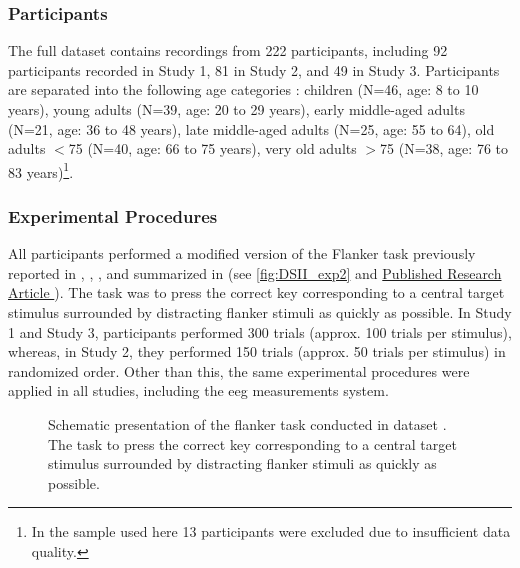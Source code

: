 \subsubsection{Participants}
\label{methods:datasets:II:participants}
The full dataset contains recordings from 222 participants, including 92 participants recorded in Study 1, 81 in Study 2, and 49 in Study 3. Participants are separated into the following age categories \cite{Reuter2019}: children (N=46, age: 8 to 10 years), young adults (N=39, age: 20 to 29 years), early middle-aged adults (N=21, age: 36 to 48 years), late middle-aged adults (N=25, age: 55 to 64), old adults $<$75 (N=40, age: 66 to 75 years), very old adults $>$75 (N=38, age: 76 to 83 years)\footnote{In the sample used here 13 participants were excluded due to insufficient data quality.}.

\subsubsection{Experimental Procedures}
\label{methods:datasets:II:experiment}
All participants performed a modified version of the Flanker task previously reported in \citeauthor{Reuter2017} \cite{Reuter2017}, \citeauthor{Winneke2012} \cite{Winneke2012}, \citeauthor{Winneke2019} \cite{Winneke2019}, and summarized in \citeauthor{Reuter2019} \cite{Reuter2019} (see \autoref{fig:DSII_exp2} and \hyperref[pub:paperII]{Published Research Article }). The task was to press the correct key corresponding to a central target stimulus surrounded by distracting flanker stimuli as quickly as possible. In Study 1 and Study 3, participants performed 300 trials (approx. 100 trials per stimulus), whereas, in Study 2, they performed 150 trials (approx. 50 trials per stimulus) in randomized order. Other than this, the same experimental procedures were applied in all studies, including the \gls{eeg} measurements system. 

\begin{figure}[h]
\begin{center}

\caption[Schematic presentation of the flanker task conducted in Dataset .]{Schematic presentation of the flanker task conducted in dataset . The task to press the correct key corresponding to a central target stimulus surrounded by distracting flanker stimuli as quickly as possible.}
\label{fig:DSII_exp2}
\end{center}
\end{figure}

